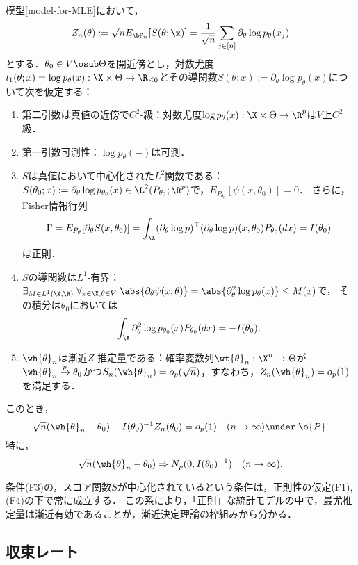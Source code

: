 \documentclass[uplatex,dvipdfmx]{jsreport}
\begin{document}
\begin{corollary}\label{cor-E-ASN-of-MLE}
    模型\ref{model-for-MLE}において，
    \[Z_n(\theta):=\sqrt{n}E_{\bP_n}[S(\theta;\x)]=\frac{1}{\sqrt{n}}\sum_{j\in[n]}\partial_\theta\log p_\theta(x_j)\]
    とする．$\theta_0\in V\osub\Theta$を開近傍とし，対数尤度$l_1(\theta;x)=\log p_\theta(x):\X\times\Theta\to\R_{\le0}$とその導関数$S(\theta;x):=\partial_\theta\log p_{\theta}(x)$について次を仮定する：
    \begin{enumerate}[({F}1)]
        \item 第二引数は真値の近傍で$C^2$-級：対数尤度$\log p_\theta(x):\X\times\Theta\to\R^p$は$V$上$C^2$級．
        \item 第一引数可測性：$\log p_\theta(-)$は可測．
        \item $S$は真値において中心化された$L^2$関数である：$S(\theta_0;x):=\partial_\theta\log p_{\theta_0}(x)\in\L^2(P_{\theta_0};\R^p)$で，$E_{P_{\theta_0}}[\psi(x,\theta_0)]=0$．
        さらに，Fisher情報行列
        \[\Gamma=E_{P_\theta}[\partial_\theta S(x,\theta_0)]=\int_\X(\partial_\theta\log p)^\top(\partial_\theta\log p)(x,\theta_0)P_{\theta_0}(dx)=I(\theta_0)\]
        は正則．
        \item $S$の導関数は$L^1$-有界：$\exists_{M\in L^1(\X,\R)}\;\forall_{x\in\X,\theta\in V}\;\abs{\partial_\theta\psi(x,\theta)}=\abs{\partial^2_\theta\log p_\theta(x)}\le M(x)$で，
        その積分は$\theta_0$においては
        \[\int_\X\partial^2_\theta\log p_{\theta_0}(x)P_{\theta_0}(dx)=-I(\theta_0).\]
        \item $\wh{\theta}_n$は漸近$Z$-推定量である：確率変数列$\wt{\theta}_n:\X^n\to\Theta$が$\wh{\theta}_n\xrightarrow{p}\theta_0$かつ$S_n(\wh{\theta}_n)=o_p(\sqrt{n})$，すなわち，$Z_n(\wh{\theta}_n)=o_p(1)$を満足する．
    \end{enumerate}
    このとき，
    \[\sqrt{n}(\wh{\theta}_n-\theta_0)-I(\theta_0)^{-1}Z_n(\theta_0)=o_p(1)\quad(n\to\infty)\under\;\o{P}.\]
    特に，
    \[\sqrt{n}(\wh{\theta}_n-\theta_0)\Rightarrow N_p(0,I(\theta_0)^{-1})\quad(n\to\infty).\]
\end{corollary}
\begin{remarks}
    条件(F3)の，スコア関数$S$が中心化されているという条件は，正則性の仮定(F1),(F4)の下で常に成立する．
    この系により，「正則」な統計モデルの中で，最尤推定量は漸近有効であることが，漸近決定理論の枠組みから分かる．
\end{remarks}

\subsection{収束レート}
\end{document}
